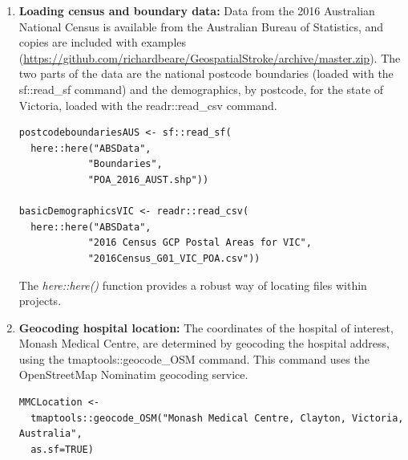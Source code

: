 \documentclass[utf8]{frontiersHLTH}
\begin{document}
\begin{table}[h]
\begin{center}
\begin{mdframed}[backgroundcolor=blue!20]
  \sffamily
  \tiny
\begin{enumerate}
\def\labelenumi{\arabic{enumi}.}
\item
  {\bf Loading census and boundary data:} Data from the 2016 Australian
  National Census is available from the Australian Bureau of Statistics, and
  copies are included with examples
  (\url{https://github.com/richardbeare/GeospatialStroke/archive/master.zip}).
  The two parts of the data are the
  national postcode boundaries (loaded with the sf::read\_sf command)
  and the demographics, by postcode, for the state of Victoria, loaded
  with the readr::read\_csv command.
\begin{lstlisting}
postcodeboundariesAUS <- sf::read_sf(
  here::here("ABSData", 
            "Boundaries", 
            "POA_2016_AUST.shp"))

basicDemographicsVIC <- readr::read_csv(
  here::here("ABSData", 
            "2016 Census GCP Postal Areas for VIC", 
            "2016Census_G01_VIC_POA.csv"))
\end{lstlisting}
The {\em here::here()} function provides a robust way of locating files within projects.
\item
  {\bf Geocoding hospital location:} The coordinates of the hospital of
  interest, Monash Medical Centre, are determined by geocoding the
  hospital address, using the tmaptools::geocode\_OSM command. This
  command uses the OpenStreetMap Nominatim geocoding service.
\begin{lstlisting}
MMCLocation <- 
  tmaptools::geocode_OSM("Monash Medical Centre, Clayton, Victoria, Australia", 
  as.sf=TRUE)


\end{lstlisting}
\end{enumerate}
\end{mdframed}
\end{center}
\end{table}
\end{document}
